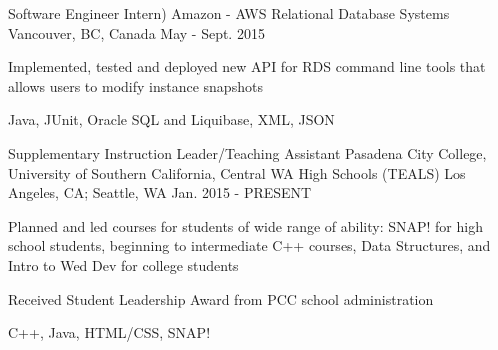 \begin{cventries}
  \cventry
    {Software Engineer Intern)} %
    {Amazon - AWS Relational Database Systems} %
    {Vancouver, BC, Canada} %
    {May - Sept. 2015} %
    {
      \begin{cvitems} %
        \item {Implemented, tested and deployed new API for RDS command line tools that allows users to modify instance snapshots}
        \item {Java, JUnit, Oracle SQL and Liquibase, XML, JSON}
      \end{cvitems}
    }
    \linebreak
  \cventry
    {Supplementary Instruction Leader/Teaching Assistant} %
    {Pasadena City College, University of Southern California, Central WA High Schools (TEALS)} %
    {Los Angeles, CA; Seattle, WA} %
    {Jan. 2015 - PRESENT} %
    {
      \begin{cvitems} %
        \item {Planned and led courses for students of wide range of ability: SNAP! for high school students, beginning to intermediate C++ courses, Data Structures, and Intro to Wed Dev for college students}
        \item {Received Student Leadership Award from PCC school administration}
        \item {C++, Java, HTML/CSS, SNAP!}
      \end{cvitems}
    }
\end{cventries}
